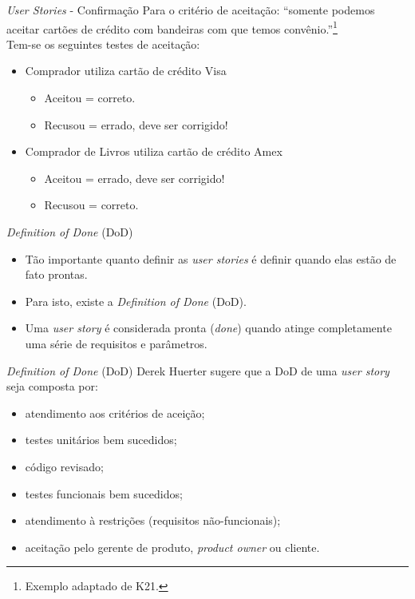 \documentclass[11pt]{beamer}
\begin{document}
   \begin{frame}{\textit{User Stories} - Confirmação}
      Para o critério de aceitação: ``somente podemos aceitar cartões de crédito com bandeiras com que temos convênio.''\footnote{Exemplo adaptado de K21.}\\
      Tem-se os seguintes testes de aceitação:
      \begin{itemize}
         \item Comprador utiliza cartão de crédito Visa
           \begin{itemize}
              \item Aceitou = correto.
              \item Recusou = errado, deve ser corrigido!
           \end{itemize}
         \item Comprador de Livros utiliza cartão de crédito Amex
           \begin{itemize}
              \item Aceitou = errado, deve ser corrigido!
              \item Recusou = correto.
           \end{itemize}
      \end{itemize}
   \end{frame}

   \begin{frame}{\textit{Definition of Done} (DoD)}
      \begin{itemize}
         \item Tão importante quanto definir as \textit{user stories} é definir quando elas estão de fato prontas.
         \item Para isto, existe a \textit{Definition of Done} (DoD).
         \item Uma \textit{user story} é considerada pronta (\textit{done}) quando atinge completamente uma série de requisitos e parâmetros.
      \end{itemize}
   \end{frame}

   \begin{frame}{\textit{Definition of Done} (DoD)}
      Derek Huerter sugere que a DoD de uma \textit{user story} seja composta por:
      \begin{itemize}
         \item atendimento aos critérios de aceição;
         \item testes unitários bem sucedidos;
         \item código revisado;
         \item testes funcionais bem sucedidos;
         \item atendimento à restrições (requisitos não-funcionais);
         \item aceitação pelo gerente de produto, \textit{product owner} ou cliente.
      \end{itemize}
   \end{frame}
\end{document}
